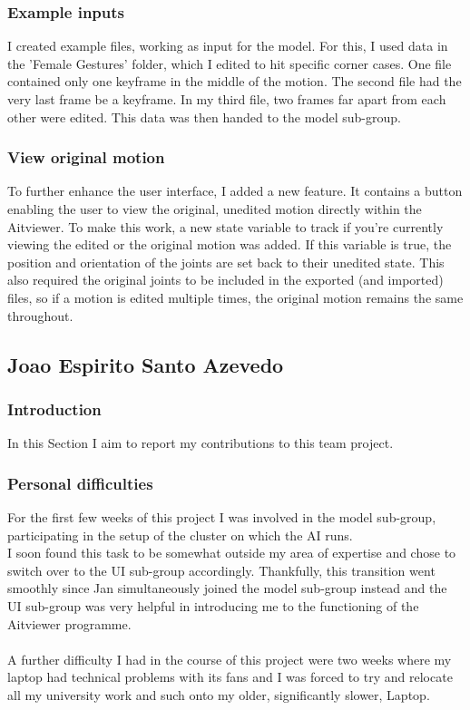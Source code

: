 \documentclass[a4paper]{scrartcl}
\begin{document}
\subsubsection*{Example inputs}
I created example files, working as input for the model. For this, I used data in the 'Female Gestures' folder, which I edited to hit specific corner cases. One file contained only one keyframe in the middle of the motion. The second file had the very last frame be a keyframe. In my third file, two frames far apart from each other were edited. This data was then handed to the model sub-group.

\subsubsection*{View original motion}
To further enhance the user interface, I added a new feature. It contains a button enabling the user to view the original, unedited motion directly within the Aitviewer. To make this work, a new state variable to track if you're currently viewing the edited or the original motion was added. If this variable is true, the position and orientation of the joints are set back to their unedited state. This also required the original joints to be included in the exported (and imported) files, so if a motion is edited multiple times, the original motion remains the same throughout.

\subsection*{Joao Espirito Santo Azevedo}
\subsubsection*{Introduction}
In this Section I aim to report my contributions to this team project.\\

\subsubsection*{Personal difficulties}
For the first few weeks of this project I was involved in the model sub-group, participating in the setup of the cluster on which the AI runs.\\

I soon found this task to be somewhat outside my area of expertise and chose to switch over to the UI sub-group accordingly. Thankfully, this transition went smoothly since Jan simultaneously joined the model sub-group instead and the UI sub-group was very helpful in introducing me to the functioning of the Aitviewer programme.\\
\\
A further difficulty I had in the course of this project were two weeks where my laptop had technical problems with its fans and I was forced to try and relocate all my university work and such onto my older, significantly slower, Laptop.
\end{document}
